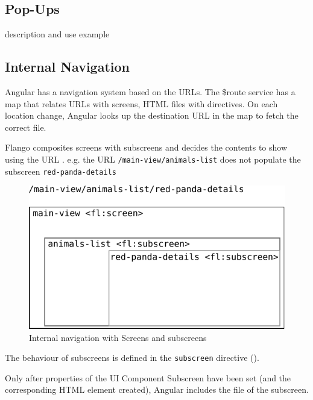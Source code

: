 \subsection{Pop-Ups}
description and use example

\subsection{Internal Navigation}
Angular has a navigation system based on the \acp{URL}.
The \$route service has a map that relates \acp{URL} with screens, \ac{HTML} files with directives.
On each location change, Angular looks up the destination \ac{URL} in the map to fetch the correct file.

Flango \cm composites screens with subscreens and decides the contents to show using the \ac{URL} .
e.g. the \ac{URL} \texttt{/main-view/animals-list} does not populate the subscreen \texttt{red-panda-details}

\begin{figure}[htb]
    \centering
    \includegraphics{figures/design/internal-navigation.pdf}
    \caption{Internal navigation with Screens and subscreens}
    \label{fig:design-internal-navigation}
\end{figure}

The behaviour of subscreens is defined in the \texttt{subscreen} directive ().

Only after properties of the UI Component Subscreen have been set (and the corresponding \ac{HTML} element created), Angular includes the file of the subscreen.

